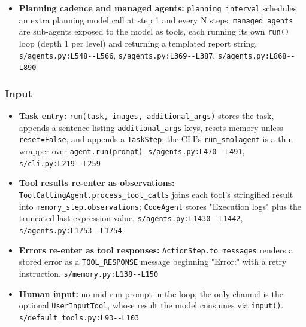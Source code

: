 \begin{itemize}
\item \textbf{Planning cadence and managed agents:} \texttt{planning\_\allowbreak{}interval} schedules an extra planning model call at step 1 and every N steps; \texttt{managed\_\allowbreak{}agents} are sub-agents exposed to the model as tools, each running its own \texttt{run(\allowbreak{})} loop (depth 1 per level) and returning a templated report string. \texttt{s/\allowbreak{}agents.\allowbreak{}py:\allowbreak{}L548-\allowbreak{}-\allowbreak{}L566}, \texttt{s/\allowbreak{}agents.\allowbreak{}py:\allowbreak{}L369-\allowbreak{}-\allowbreak{}L387}, \texttt{s/\allowbreak{}agents.\allowbreak{}py:\allowbreak{}L868-\allowbreak{}-\allowbreak{}L890}
\end{itemize}

\subsubsection*{Input}
\begin{itemize}
\item \textbf{Task entry:} \texttt{run(\allowbreak{}task, images, additional\_\allowbreak{}args)} stores the task, appends a sentence listing \texttt{additional\_\allowbreak{}args} keys, resets memory unless \texttt{reset=False}, and appends a \texttt{TaskStep}; the CLI's \texttt{run\_\allowbreak{}smolagent} is a thin wrapper over \texttt{agent.\allowbreak{}run(\allowbreak{}prompt)}. \texttt{s/\allowbreak{}agents.\allowbreak{}py:\allowbreak{}L470-\allowbreak{}-\allowbreak{}L491}, \texttt{s/\allowbreak{}cli.\allowbreak{}py:\allowbreak{}L219-\allowbreak{}-\allowbreak{}L259}
\item \textbf{Tool results re-enter as observations:} \texttt{ToolCallingAgent.\allowbreak{}process\_\allowbreak{}tool\_\allowbreak{}calls} joins each tool's stringified result into \texttt{memory\_\allowbreak{}step.\allowbreak{}observations}; \texttt{CodeAgent} stores "Execution logs" plus the truncated last expression value. \texttt{s/\allowbreak{}agents.\allowbreak{}py:\allowbreak{}L1430-\allowbreak{}-\allowbreak{}L1442}, \texttt{s/\allowbreak{}agents.\allowbreak{}py:\allowbreak{}L1753-\allowbreak{}-\allowbreak{}L1754}
\item \textbf{Errors re-enter as tool responses:} \texttt{ActionStep.\allowbreak{}to\_\allowbreak{}messages} renders a stored error as a \texttt{TOOL\_\allowbreak{}RESPONSE} message beginning "Error:" with a retry instruction. \texttt{s/\allowbreak{}memory.\allowbreak{}py:\allowbreak{}L138-\allowbreak{}-\allowbreak{}L150}
\item \textbf{Human input:} no mid-run prompt in the loop; the only channel is the optional \texttt{UserInputTool}, whose result the model consumes via \texttt{input(\allowbreak{})}. \texttt{s/\allowbreak{}default\_\allowbreak{}tools.\allowbreak{}py:\allowbreak{}L93-\allowbreak{}-\allowbreak{}L103}
\end{itemize}

